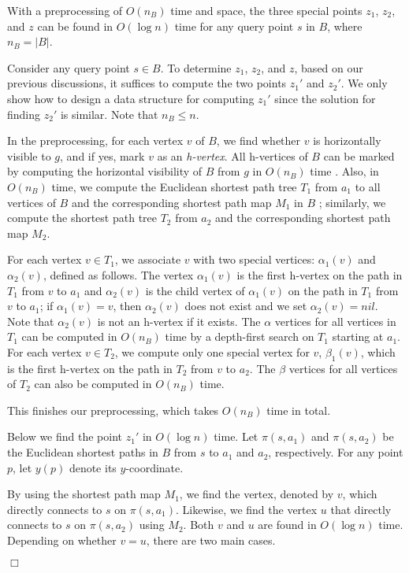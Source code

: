 \documentclass[english,runningheads,11pt]{llncs}
\newenvironment{proof}{\noindent {\textbf{Proof:}}\rm}{\hfill $\Box$\rm}
\begin{document}
\begin{lemma}\label{lem:170}
With a preprocessing of $O(n_B)$ time and space,
the three special points $z_1$, $z_2$, and
$z$ can be found in $O(\log n)$ time for any query point $s$ in $B$, where $n_B=|B|$.
\end{lemma}
\begin{proof}
Consider any query point $s\in B$. To determine $z_1$, $z_2$, and
$z$, based on our previous discussions, it suffices to compute the two points $z_1'$ and $z_2'$.
We only show how to design a data structure for computing $z_1'$ since the solution for finding $z_2'$ is similar.
Note that $n_B\leq n$.

In the preprocessing, for each vertex $v$ of $B$, we find whether $v$ is horizontally
visible to $g$, and if yes, mark $v$ as an {\em h-vertex}. All h-vertices of $B$ can be marked
by computing the horizontal visibility of $B$ from $g$ in $O(n_B)$ time \cite{ref:JoeCo87,ref:LeeVi83}.
Also, in $O(n_B)$ time, we compute the Euclidean shortest path
tree $T_1$ from $a_1$ to all vertices of $B$ and the corresponding shortest path map
$M_1$ in $B$ \cite{ref:GuibasLi87}; similarly, we compute the shortest path
tree $T_2$ from $a_2$ and the corresponding shortest path map $M_2$.

For each vertex $v\in T_1$, we associate $v$ with two special vertices:
$\alpha_1(v)$ and $\alpha_2(v)$, defined as follows. The vertex $\alpha_1(v)$ is the first
h-vertex on the path in $T_1$ from $v$ to $a_1$ and $\alpha_2(v)$ is the child
vertex of $\alpha_1(v)$ on the path in $T_1$ from $v$ to $a_1$; if $\alpha_1(v)=v$,
then $\alpha_2(v)$ does not exist and we set $\alpha_2(v)=nil$. Note that $\alpha_2(v)$ is
not an h-vertex if it exists. The $\alpha$ vertices for all vertices in $T_1$ can be computed in $O(n_B)$ time by a depth-first search on $T_1$ starting at $a_1$.
For each vertex $v\in T_2$, we compute only one special vertex for $v$, $\beta_1(v)$, which
is the first h-vertex on the path in $T_2$ from $v$ to $a_2$. The $\beta$ vertices for all vertices of $T_2$ can also be computed in $O(n_B)$ time.

This finishes our preprocessing, which takes $O(n_B)$ time in total.

Below we find the point $z_1'$ in $O(\log n)$ time.
Let $\pi(s,a_1)$ and $\pi(s,a_2)$ be the Euclidean shortest paths in $B$
from $s$ to $a_1$ and $a_2$, respectively. For any point $p$, let $y(p)$ denote its $y$-coordinate.

By using the shortest path map $M_1$, we find the vertex, denoted by $v$, which directly connects
to $s$ on $\pi(s,a_1)$. Likewise, we find the vertex $u$ that directly connects to $s$ on
$\pi(s,a_2)$ using $M_2$. Both $v$ and $u$ are found in $O(\log n)$ time. Depending on whether $v=u$, there are two main cases.


\end{proof}
\end{document}
